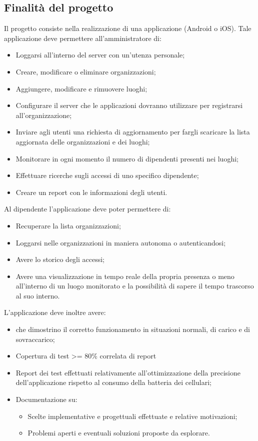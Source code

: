 \documentclass[../studio-di-fattibilita.tex]{subfiles}
\begin{document}
\subsection{Finalità del progetto}%
\label{sub:finalita_del_progetto}
Il progetto consiste nella realizzazione di una applicazione (Android o iOS). Tale applicazione deve permettere all'amministratore di:
\begin{itemize}
  \item Loggarsi all'interno del server con un'utenza personale;
  \item Creare, modificare o eliminare organizzazioni;
  \item Aggiungere, modificare e rimuovere luoghi;
  \item Configurare il server  che le applicazioni dovranno utilizzare per registrarsi all'organizzazione;
  \item Inviare agli utenti una richiesta di aggiornamento per fargli scaricare la lista aggiornata delle organizzazioni e dei luoghi;
  \item Monitorare in ogni momento il numero di dipendenti presenti nei luoghi;
  \item Effettuare ricerche sugli accessi di uno specifico dipendente;
  \item Creare un report con le informazioni degli utenti.
\end{itemize}
Al dipendente l'applicazione deve poter permettere di:
\begin{itemize}
  \item Recuperare la lista organizzazioni;
  \item Loggarsi nelle organizzazioni in maniera autonoma o autenticandosi;
  \item Avere lo storico degli accessi;
  \item Avere una visualizzazione in tempo reale della propria presenza o meno all'interno di un luogo monitorato e la possibilità di sapere il tempo trascorso al suo interno.
\end{itemize}
L'applicazione deve inoltre avere:
\begin{itemize}
  \item {} che dimostrino il corretto funzionamento in situazioni normali, di carico e di sovraccarico;
  \item Copertura di test >= 80\% correlata di report
  \item Report dei test effettuati relativamente all'ottimizzazione della precisione dell'applicazione rispetto al consumo della batteria dei cellulari;
  \item Documentazione su:
  \begin{itemize}
    \item Scelte implementative e progettuali effettuate e relative motivazioni;
    \item Problemi aperti e eventuali soluzioni proposte da esplorare.
  \end{itemize}
\end{itemize}
\end{document}
